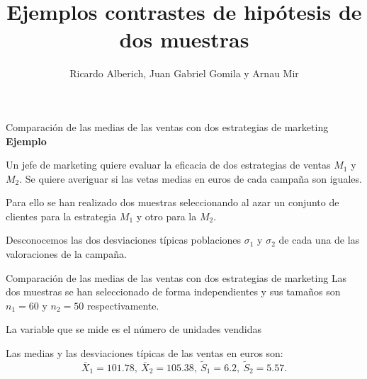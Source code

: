 \documentclass[
  ignorenonframetext,
]{beamer}
\title{Ejemplos contrastes de hipótesis de dos muestras}
\author{Ricardo Alberich, Juan Gabriel Gomila y Arnau Mir}
\date{}
\begin{document}
\frame{\titlepage}

\begin{frame}{Comparación de las medias de las ventas con dos
estrategias de marketing}
\protect\hypertarget{comparaciuxf3n-de-las-medias-de-las-ventas-con-dos-estrategias-de-marketing}{}
\textbf{Ejemplo}

Un jefe de marketing quiere evaluar la eficacia de dos estrategias de
ventas \(M_1\) y \(M_2\). Se quiere averiguar si las vetas medias en
euros de cada campaña son iguales.

Para ello se han realizado dos muestras seleccionando al azar un
conjunto de clientes para la estrategia \(M_1\) y otro para la \(M_2\).

Desconocemos las dos desviaciones típicas poblaciones \(\sigma_1\) y
\(\sigma_2\) de cada una de las valoraciones de la campaña.
\end{frame}

\begin{frame}{Comparación de las medias de las ventas con dos
estrategias de marketing}
\protect\hypertarget{comparaciuxf3n-de-las-medias-de-las-ventas-con-dos-estrategias-de-marketing-1}{}
Las dos muestras se han seleccionado de forma independientes y sus
tamaños son \(n_1=60\) y \(n_2=50\) respectivamente.

La variable que se mide es el número de unidades vendidas

Las medias y las desviaciones típicas de las ventas en euros son: \[
\overline{X}_1= 101.78 ,\  \overline{X}_2=105.38,\ 
\widetilde{S}_1=6.2,\  \widetilde{S}_2=5.57.
\]
\end{frame}
\end{document}
